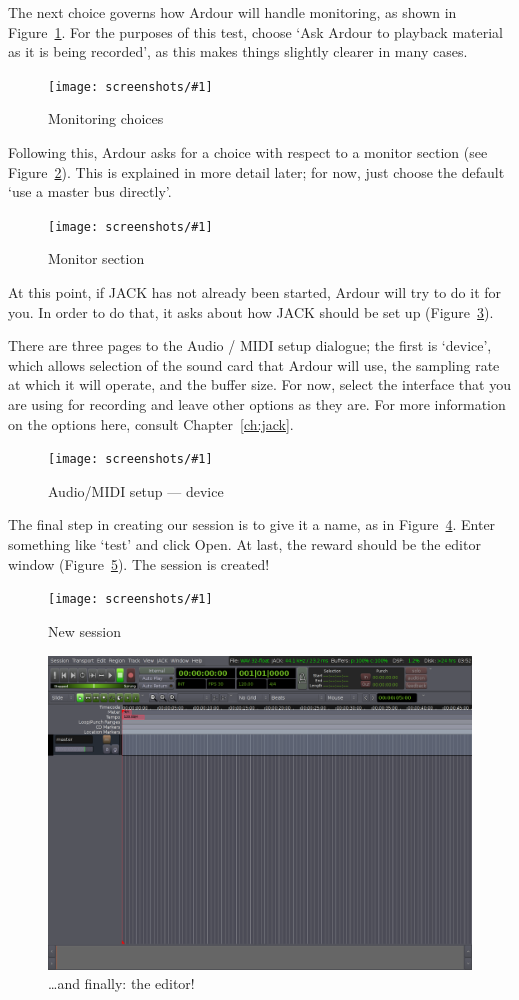 \documentclass[10pt,a4paper]{book}
\newcommand{\button}[1]{#1}
\newcommand{\screenshot}[3]{%
\begin{figure}[ht]%
\begin{center}
\texttt{[image: screenshots/\#1]}
\end{center}
\caption{#2}
\label{#3}
\end{figure}}
\begin{document}
The next choice governs how Ardour will handle monitoring, as shown in
Figure~\ref{fig:monitoring-choices}.  For the purposes of this test,
choose `Ask Ardour to playback material as it is being recorded', as
this makes things slightly clearer in many cases.

\screenshot{monitoring-choices.png}{Monitoring choices}{fig:monitoring-choices}

Following this, Ardour asks for a choice with respect to a monitor
section (see Figure~\ref{fig:monitor-section}).  This is explained in
more detail later; for now, just choose the default `use a master bus
directly'.

\screenshot{monitor-section.png}{Monitor section}{fig:monitor-section}

At this point, if JACK has not already been started, Ardour will try
to do it for you.  In order to do that, it asks about how JACK should
be set up (Figure~\ref{fig:audio-midi-setup-device}).

There are three pages to the Audio / MIDI setup dialogue; the first is
`device', which allows selection of the sound card that Ardour will
use, the sampling rate at which it will operate, and the buffer size.
For now, select the interface that you are using for recording and
leave other options as they are.  For more information on the options
here, consult Chapter~\ref{ch:jack}.

\screenshot{audio-midi-setup-device.png}{Audio/MIDI setup --- device}{fig:audio-midi-setup-device}

The final step in creating our session is to give it a name, as in
Figure~\ref{fig:new-session}.  Enter something like `test' and click
\button{Open}.  At last, the reward should be the editor window
(Figure~\ref{fig:editor}).  The session is created!

\screenshot{new-session.png}{New session}{fig:new-session}

\begin{figure}[ht]
\begin{center}
\includegraphics[scale=0.3]{screenshots/editor.png}
\end{center}
\caption{\ldots and finally: the editor!}
\label{fig:editor}
\end{figure}
\end{document}
